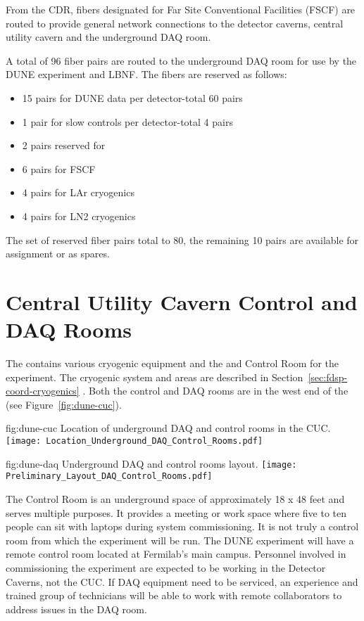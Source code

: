 From the CDR, fibers designated for Far Site Conventional Facilities
(FSCF) are routed to provide general network connections to the
detector caverns, central utility cavern and the underground DAQ room.

A total of 96 fiber pairs are routed to the underground DAQ room for
use by the DUNE experiment and LBNF. The fibers are reserved as
follows:
\begin{itemize}
  \item 15 pairs for DUNE data per detector-total 60 pairs
\item 1 pair for slow controls per detector-total 4 pairs
\item 2 pairs reserved for 
\item 6 pairs for FSCF
\item 4 pairs for LAr cryogenics
  \item 4 pairs for LN2 cryogenics
\end{itemize}

The set of reserved fiber pairs total to 80, the remaining 10 pairs
are available for assignment or as spares.


\section{Central Utility Cavern Control and DAQ Rooms}
\label{sec:fdsp-coord-cuc-daq}

The  contains various cryogenic equipment and the
 and Control Room for the  experiment.  The
cryogenic system and areas are described in
Section~\ref{sec:fdsp-coord-cryogenics} . Both the control and DAQ
rooms are in the west end of the  (see
Figure~\ref{fig:dune-cuc}).
\begin{dunefigure}{fig:dune-cuc}
  {Location of underground DAQ and control rooms in the CUC.}
  \texttt{[image: Location\_Underground\_DAQ\_Control\_Rooms.pdf]}
\end{dunefigure}
\begin{dunefigure}{fig:dune-daq}
  {Underground DAQ and control rooms layout.}
  \texttt{[image: Preliminary\_Layout\_DAQ\_Control\_Rooms.pdf]}
\end{dunefigure}


The Control Room is an underground space of approximately 18 x 48 feet
and serves multiple purposes.  It provides a meeting or work space
where five to ten people can sit with laptops during system
commissioning.  It is not truly a control room from which the
experiment will be run.  The DUNE experiment will have a remote
control room located at Fermilab's main campus.  Personnel involved in
commissioning the experiment are expected to be working in the
Detector Caverns, not the CUC.  If DAQ equipment need to be serviced,
an experience and trained group of technicians will be able to work
with remote collaborators to address issues in the DAQ room.

